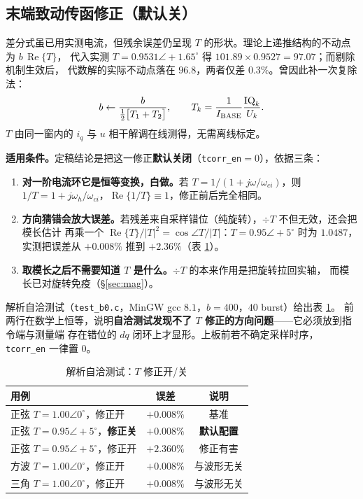 \documentclass[11pt,a4paper]{ctexart}
\newcommand{\RE}{\operatorname{Re}}
\begin{document}
\subsection{末端致动传函修正（默认关）}
\label{sec:tcorr}

差分式虽已用实测电流，但残余误差仍呈现 $T$ 的形状。理论上递推结构的不动点为 $b\,\operatorname{Re}\{T\}$，
代入实测 $T=0.9531\angle+1.65^{\circ}$ 得 $101.89\times0.9527=97.07$；而剔除机制生效后，
代数解的实际不动点落在 $96.8$，两者仅差 $0.3\%$。曾因此补一次复除法：
\begin{equation}
b\leftarrow\frac{b}{\tfrac12\big[T_1+T_2\big]},\qquad T_k=\frac{1}{I_{\rm BASE}}\frac{\mathrm{IQ}_k}{U_k}.
\label{eq:tcorr}
\end{equation}
$T$ 由同一窗内的 $i_q$ 与 $u$ 相干解调在线测得，无需离线标定。

\textbf{适用条件。}定稿结论是把这一修正\textbf{默认关闭}（\texttt{tcorr\_en}$=0$），依据三条：

\begin{enumerate}
\item \textbf{对一阶电流环它是恒等变换，白做。}若 $T=1/(1+j\omega/\omega_{ci})$，则
$1/T=1+j\omega_h/\omega_{ci}$，$\RE\{1/T\}\equiv1$，修正前后完全相同。
\item \textbf{方向猜错会放大误差。}若残差来自采样错位（纯旋转），$\div T$ 不但无效，还会把模长估计
再乘一个 $\RE\{T\}/|T|^2=\cos\angle T/|T|$：$T=0.95\angle+5^\circ$ 时为 $1.0487$，
实测把误差从 $+0.008\%$ 推到 $+2.36\%$（表 \ref{tab:selftest}）。
\item \textbf{取模长之后不需要知道 $T$ 是什么。}$\div T$ 的本来作用是把旋转拉回实轴，
而模长已对旋转免疫（\S\ref{sec:mag}）。
\end{enumerate}

解析自洽测试（\texttt{test\_b0.c}，MinGW gcc $8.1$，$b=400$，$40$ burst）给出表 \ref{tab:selftest}。
前两行在数学上恒等，说明\textbf{自洽测试发现不了 $T$ 修正的方向问题}——它必须放到指令端与测量端
存在错位的 $dq$ 闭环上才显形。上板前若不确定采样时序，\texttt{tcorr\_en} 一律置 $0$。

\begin{table}[H]
\centering
\caption{解析自洽测试：$T$ 修正开/关}
\label{tab:selftest}
\begin{tabular}{lcc}
\toprule
用例 & 误差 & 说明\\
\midrule
正弦 $T=1.00\angle0^\circ$，修正开 & $+0.008\%$ & 基准\\
正弦 $T=0.95\angle+5^\circ$，\textbf{修正关} & $\bm{+0.008\%}$ & \textbf{默认配置}\\
正弦 $T=0.95\angle+5^\circ$，修正开 & $+2.360\%$ & 修正有害\\
方波 $T=1.00\angle0^\circ$，修正开 & $+0.008\%$ & 与波形无关\\
三角 $T=1.00\angle0^\circ$，修正开 & $+0.008\%$ & 与波形无关\\
\bottomrule
\end{tabular}
\end{table}
\end{document}
